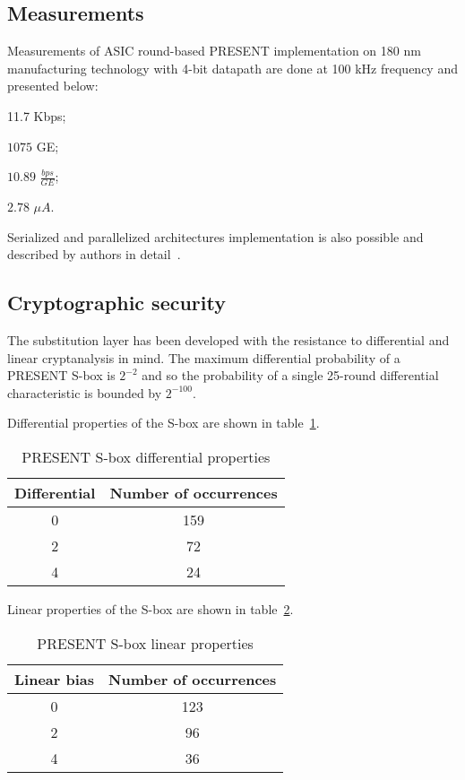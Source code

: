 \subsection{Measurements}

Measurements of ASIC round-based PRESENT implementation on 180 nm manufacturing
technology with 4-bit datapath are done at 100 kHz frequency and presented below:

\begin{description}
    \setlength{\itemsep}{1pt}
        \setlength{\parskip}{0pt}
        \setlength{\parsep}{0pt}
    \item[throughput:] 11.7 Kbps;
    \item[area:] $ 1075 $ GE;
    \item[efficiency:] $ 10.89 $ $ \frac{bps}{GE} $;
    \item[current:] $ 2.78 $ $ \mu A $.
\end{description}

Serialized and parallelized architectures implementation is also possible and
described by authors in detail~\cite{secsi:2007}.

\subsection{Cryptographic security}

The substitution layer has been developed with the resistance to differential
and linear cryptanalysis in mind.
The maximum differential probability of a PRESENT S-box is $ 2^{-2} $ and so the
probability of a single 25-round differential characteristic is bounded by $
2^{-100} $.

Differential properties of the S-box are shown in
table~\ref{tbl:present-sbox-diff}.
\begin{table}[htbp]
    \centering
    \caption{PRESENT S-box differential properties}
    \label{tbl:present-sbox-diff}
    \begin{tabular}{|c|c|} \hline
        Differential & Number of occurrences \\ \hline
        0  &  159 \\ \hline
        2  &  72  \\ \hline
        4  &  24  \\ \hline
    \end{tabular}
\end{table}

Linear properties of the S-box are shown in table~\ref{tbl:present-sbox-lin}.
\begin{table}[htbp]
    \centering
    \caption{PRESENT S-box linear properties}
    \label{tbl:present-sbox-lin}
    \begin{tabular}{|c|c|} \hline
        Linear bias & Number of occurrences \\ \hline
        0 & 123 \\ \hline
        2 & 96  \\ \hline 
        4 & 36  \\ \hline 
    \end{tabular}
\end{table}

